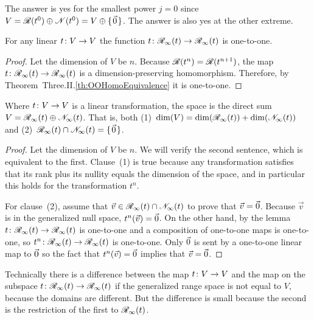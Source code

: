 The answer is yes for the smallest power $j=0$ since
\( V=\mathscr{R}(t^0)\oplus\mathscr{N}(t^0)=V\oplus\mbox{$\{\hspace{0.1em}\vec{0}\hspace{0.1em}\}$} \).
The answer is also yes at the other extreme.

\begin{lemma} \label{lem:RestONeToOne}
For any linear \( \mbox{$t\colon V\to V$} \) 
the function \( \mbox{$t\colon \mathscr{R}_\infty(t)\to \mathscr{R}_\infty(t)$} \)
is one-to-one.
\end{lemma}

\begin{proof}
Let the dimension of $V$ be $n$.
Because \( \mathscr{R}(t^n)=\mathscr{R}(t^{n+1}) \),
the map \( \mbox{$t\colon \mathscr{R}_\infty(t)\to \mathscr{R}_\infty(t)$} \) is
a dimension-preserving homomorphism. 
Therefore, by Theorem~Three.II.\ref{th:OOHomoEquivalence} it is one-to-one.  
\end{proof}

\begin{corollary} \label{GenRngNullDirSumToSp}
Where \( \mbox{$t\colon V\to V$} \) is a linear transformation, 
the space is the direct sum 
\( V=\mathscr{R}_\infty(t)\oplus\mathscr{N}_\infty(t) \).
That is, both (1)~\( \dim(V)=\dim(\mathscr{R}_\infty(t))+\dim(\mathscr{N}_\infty(t)) \) 
and (2)~\( \mathscr{R}_\infty(t)\cap\mathscr{N}_\infty(t)=\mbox{$\{\hspace{0.1em}\vec{0}\hspace{0.1em}\}$} \).
\end{corollary}

\begin{proof}
Let the dimension of $V$ be $n$.
We will verify the second sentence, which is equivalent to the first.
Clause~(1) is true because any transformation satisfies that
its rank plus its nullity
equals the dimension of the space,  
and in particular this holds for the transformation $t^n$.

For clause~(2), assume that
\( \vec{v}\in\mathscr{R}_\infty(t)\cap\mathscr{N}_\infty(t) \)
to prove that $\vec{v}=\vec{0}$.
Because \( \vec{v} \) is in the generalized null space, \( t^n(\vec{v})=\vec{0} \).
On the other hand, by the lemma
\( \mbox{$t\colon \mathscr{R}_\infty(t)\to \mathscr{R}_\infty(t)$} \)
is one-to-one and 
a composition of one-to-one maps is one-to-one, so
\( \mbox{$t^n\colon \mathscr{R}_\infty(t)\to \mathscr{R}_\infty(t)$} \) is one-to-one.
Only \( \vec{0} \) is sent by a one-to-one linear map to
\( \vec{0} \)  so the fact that \( t^n(\vec{v})=\vec{0} \) implies that
\( \vec{v}=\vec{0} \).
\end{proof}

\begin{remark}
Technically there is a difference between the map $\mbox{$t\colon V\to V$}$ and
the map on the subspace \( \mbox{$t\colon \mathscr{R}_\infty(t)\to \mathscr{R}_\infty(t)$} \)
if the generalized range space is not equal to $V$, because the domains are
different.
But the difference is small because
the second is the 
restriction %
of the first to 
$\mathscr{R}_\infty(t)$. 
\end{remark}

